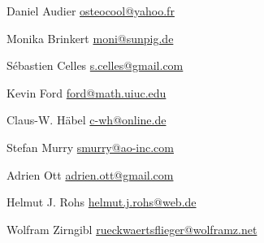 \item Daniel Audier \url{osteocool@yahoo.fr}
\item Monika Brinkert \url{moni@sunpig.de}
\item Sébastien Celles \url{s.celles@gmail.com}
\item Kevin Ford \url{ford@math.uiuc.edu}
\item Claus-W. Häbel \url{c-wh@online.de}
\item Stefan Murry \url{smurry@ao-inc.com}
\item Adrien Ott \url{adrien.ott@gmail.com}
\item Helmut J. Rohs \url{helmut.j.rohs@web.de}
\item Wolfram Zirngibl \url{rueckwaertsflieger@wolframz.net}



